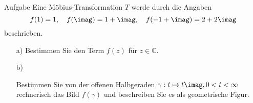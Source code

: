 \documentclass{scrartcl}
\def\mbb#1{\mathbb{#1}}
\def\bC{\mbb{C}}
\begin{document}
\begin{section}{Aufgabe}%
Eine Möbius-Transformation $T$ werde durch die Angaben
\[f(1)=1,\quad f(\imag)=1+\imag,\quad f(-1+\imag)=2+2\imag\]
beschrieben.
\begin{itemize}
\item[a)]
Bestimmen Sie den Term $f(z)$ für $z \in \bC$.
\item[b)]

Bestimmen Sie von der offenen Halbgeraden $\gamma : t \mapsto t \imag, 0 < t < \infty$ rechnerisch
das Bild $f(\gamma)$ und beschreiben Sie es als geometrische Figur.
\end{itemize}
\end{section}
\end{document}
